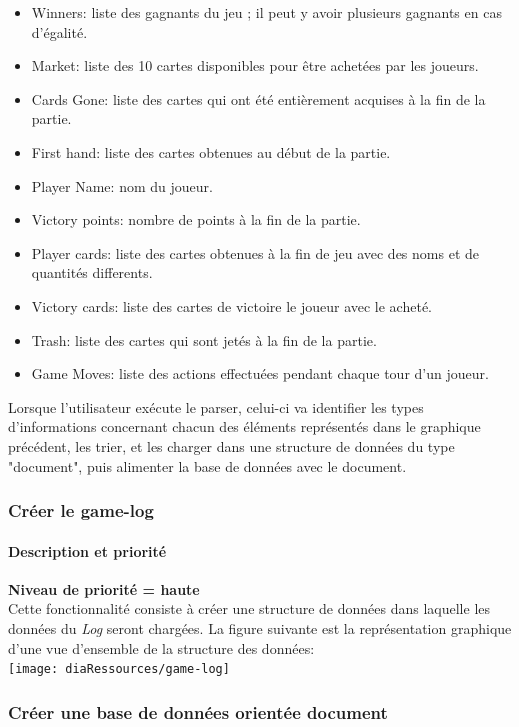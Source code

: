 \begin{itemize}
\item Winners: liste des gagnants du jeu ; il peut y avoir plusieurs gagnants en cas d'égalité.
\item Market: liste des 10 cartes disponibles pour être achetées par les joueurs.
\item Cards Gone: liste des cartes qui ont été entièrement acquises à la fin de la partie.
\item First hand: liste des cartes obtenues au début de la partie.%
\item Player Name: nom du joueur.
\item Victory points: nombre de points à la fin de la partie.
\item Player cards: liste des cartes obtenues à la fin de jeu avec des noms et de quantités differents.
\item Victory cards: liste des cartes de victoire le joueur avec le acheté.
\item Trash: liste des cartes qui sont jetés à la fin de la partie.
\item Game Moves: liste des actions effectuées pendant chaque tour d'un joueur.
\end{itemize}
Lorsque l'utilisateur exécute le parser, celui-ci va identifier les types d'informations concernant chacun des éléments représentés dans le graphique précédent, les trier, et les charger dans une structure de données du type "document", puis alimenter la base de données avec le document. \\

\subsubsection{Créer le game-log}
\paragraph*{Description et priorité}
\textbf{Niveau de priorité = haute}\\
Cette fonctionnalité consiste à créer une structure de données dans laquelle les données du \textit{Log} seront chargées.
La figure suivante est la représentation graphique d'une vue d'ensemble de la structure des données:\\
\texttt{[image: diaRessources/game-log]}

\subsubsection{Créer une base de données orientée document }

